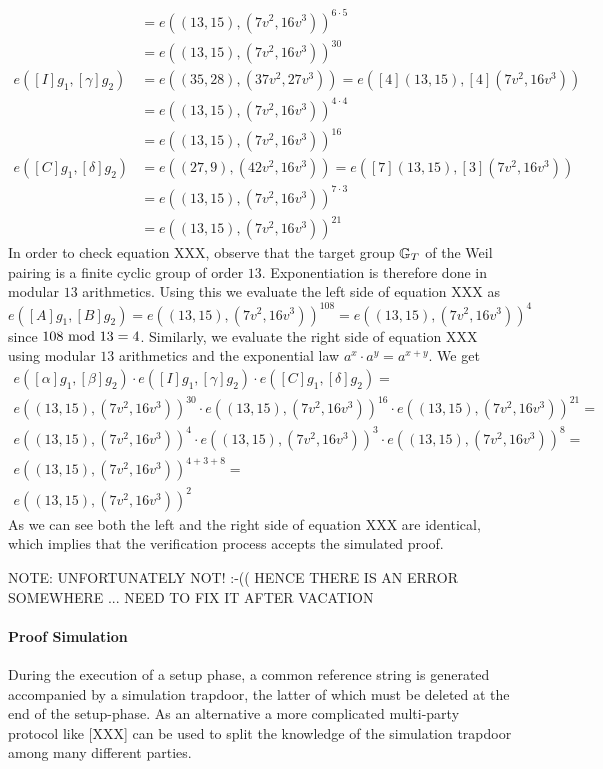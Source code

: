 \begin{example}
\begin{align*}
               & = e((13,15),(7v^2,16v^3))^{6\cdot 5}\\
               & = e((13,15),(7v^2,16v^3))^{30}\\   
e([I]g_1,[\gamma]g_2) & = e((35,28),(37v^2,27v^3)) 
                            = e([4](13,15),[4](7v^2,16v^3))\\
               & = e((13,15),(7v^2,16v^3))^{4\cdot 4}\\
               & = e((13,15),(7v^2,16v^3))^{16}\\ 
e([C]g_1,[\delta]g_2) & = e((27,9),(42v^2,16v^3)) 
                            = e([7](13,15),[3](7v^2,16v^3))\\
               & = e((13,15),(7v^2,16v^3))^{7\cdot 3}\\
               & = e((13,15),(7v^2,16v^3))^{21}
\end{align*}  
In order to check equation XXX, observe that the target group $\mathbb{G}_T$ of the Weil pairing is a finite cyclic group of order $13$. Exponentiation is therefore done in modular $13$ arithmetics. Using this we evaluate the left side of equation XXX as  
$$
e([A]g_1,[B]g_2) = e((13,15),(7v^2,16v^3))^{108} =e((13,15),(7v^2,16v^3))^{4}
$$
since $108 \text{ mod } 13=4$. Similarly, we evaluate the right side of equation XXX using modular $13$ arithmetics and the exponential law $a^x\cdot a^y = a^{x+y}$. We get
\begin{align*}
e([\alpha]g_1,[\beta]g_2)\cdot e([I]g_1,[\gamma]g_2)\cdot e([C]g_1,[\delta]g_2) =\\
e((13,15),(7v^2,16v^3))^{30}\cdot e((13,15),(7v^2,16v^3))^{16}\cdot e((13,15),(7v^2,16v^3))^{21} =\\
e((13,15),(7v^2,16v^3))^{4}\cdot e((13,15),(7v^2,16v^3))^{3}\cdot e((13,15),(7v^2,16v^3))^{8} =\\
e((13,15),(7v^2,16v^3))^{4+3+8} = \\
e((13,15),(7v^2,16v^3))^{2}
\end{align*}
As we can see both the left and the right side of equation XXX are identical, which implies that the verification process accepts the simulated proof.

NOTE: UNFORTUNATELY NOT! :-(( HENCE THERE IS AN ERROR SOMEWHERE ... NEED TO FIX IT AFTER VACATION
\end{example}
\paragraph{Proof Simulation} During the execution of a setup phase, a common reference string is generated accompanied by a simulation trapdoor, the latter of which must be deleted at the end of the setup-phase. As an alternative a more complicated multi-party protocol like [XXX] can be used to split the knowledge of the simulation trapdoor among many different parties.

